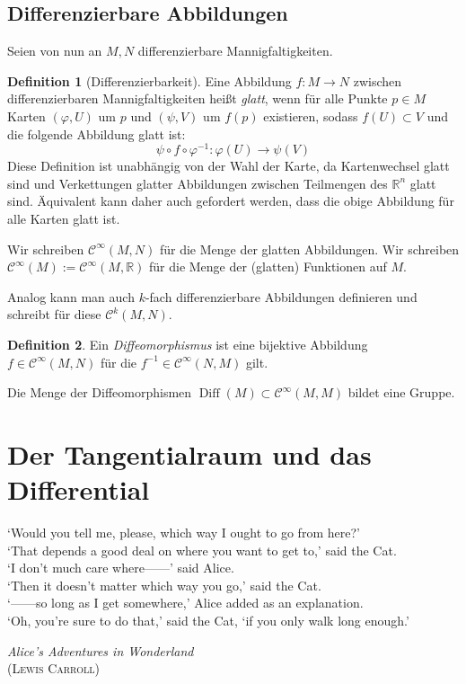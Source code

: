 \documentclass[a4paper]{scrreprt}
\numberwithin{equation}{chapter}
\DeclareMathOperator{\Diff}{Diff}
\newcommand{\R}{\mathbb{R}}
\newcommand{\sC}{\mathcal{C}^{\infty}}
\theoremstyle{definition}
\newtheorem{defn}{Definition}[section]
\begin{document}
	\section{Differenzierbare Abbildungen}
		Seien von nun an $M,N$ differenzierbare Mannigfaltigkeiten.
		\begin{defn}[Differenzierbarkeit]
			Eine Abbildung $f\colon M\rightarrow N$ zwischen differenzierbaren Mannigfaltigkeiten heißt \emph{glatt}, wenn für alle Punkte $p\in M$ Karten $(\varphi,U)$ um  $p$ und $(\psi,V)$ um $f(p)$ existieren, sodass $f(U)\subset V$ und die folgende Abbildung glatt ist:
			\begin{equation}
				\psi\circ f \circ \varphi^{-1}\colon \varphi(U)\rightarrow \psi(V)
			\end{equation}
			Diese Definition ist unabhängig von der Wahl der Karte, da Kartenwechsel glatt sind und Verkettungen glatter Abbildungen zwischen Teilmengen des $\R^n$ glatt sind. Äquivalent kann daher auch gefordert werden, dass die obige Abbildung für alle Karten glatt ist.

			Wir schreiben $\sC(M,N)$ für die Menge der glatten Abbildungen. Wir schreiben $\sC(M) := \sC(M,\R)$ für die Menge der (glatten) Funktionen auf $M$.
			
			Analog kann man auch $k$-fach differenzierbare Abbildungen definieren und schreibt für diese $\mathcal{C}^k(M,N)$.
		\end{defn}
		\begin{defn}
			Ein \emph{Diffeomorphismus} ist eine bijektive Abbildung $f\in\sC(M,N)$ für die $f^{-1}\in\sC(N,M)$ gilt.

			Die Menge der Diffeomorphismen $\Diff(M)\subset\sC(M,M)$ bildet eine Gruppe.
		\end{defn}


\chapter{Der Tangentialraum und das Differential}
\epigraph{`Would you tell me, please, which way I ought to go from here?'\\
	`That depends a good deal on where you want to get to,' said the Cat.\\
	`I don't much care where------' said Alice.\\
	`Then it doesn't matter which way you go,' said the Cat.\\
	`------so long as I get somewhere,' Alice added as an explanation.\\
	`Oh, you're sure to do that,' said the Cat, `if you only walk long enough.'}
{\emph{Alice's Adventures in Wonderland}\\(\textsc{Lewis Carroll})}
\end{document}

